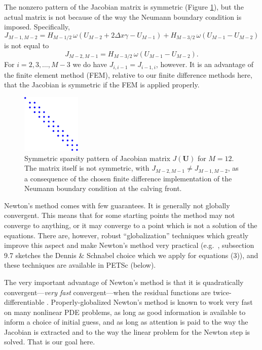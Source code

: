 \documentclass[11pt,final,reqno]{amsart}
\newcommand{\bU}{\mathbf{U}}
\begin{document}
The nonzero pattern of the Jacobian matrix is symmetric (Figure \ref{fig:spyJ}), but the actual matrix is not because of the way the Neumann boundary condition is imposed.  Specifically,
    $$J_{M-1,M-2} = H_{M-1/2}\, \omega(U_{M-2}+2\Delta x \gamma - U_{M-1}) + H_{M-3/2}\, \omega(U_{M-1}-U_{M-2})$$
is not equal to
    $$J_{M-2,M-1} = H_{M-3/2}\, \omega(U_{M-1}-U_{M-2}).$$
For $i=2,3,\dots,M-3$ we do have $J_{i,i-1} = J_{i-1,i}$, however.  It is an advantage of the finite element method (FEM), relative to our finite difference methods here, that the Jacobian is symmetric if the FEM is applied properly.

\begin{figure}[ht] 
\begin{center}
\includegraphics[width=0.25\textwidth]{spyJ}
\end{center}
\caption{Symmetric sparsity pattern of Jacobian matrix $J(\bU)$ for $M=12$.  The matrix itself is not symmetric, with $J_{M-2,M-1} \ne J_{M-1,M-2}$, as a consequence of the chosen finite difference implementation of the Neumann boundary condition at the calving front.}
\label{fig:spyJ}
\end{figure}

Newton's method comes with few guarantees.  It is generally not globally convergent.  This means that for some starting points the method may not converge to anything, or it may converge to a point which is not a solution of the equations.  There are, however, robust ``globalization'' techniques which greatly improve this aspect and make Newton's method very practical (e.g.~\cite{Pressetal}, subsection 9.7 sketches the Dennis \& Schnabel choice which we apply for equations (3)), and these techniques are available in PETSc (below).  

The very important advantage of Newton's method is that it is quadratically convergent---\emph{very fast} convergent---when the residual functions are twice-differentiable \cite{BurdenFaires}.  Properly-globalized Newton's method is known to work very fast on many nonlinear PDE problems, as long as good information is available to inform a choice of initial guess, and as long as attention is paid to the way the Jacobian is extracted and to the way the linear problem for the Newton step is solved.  That is our goal here.
\end{document}
